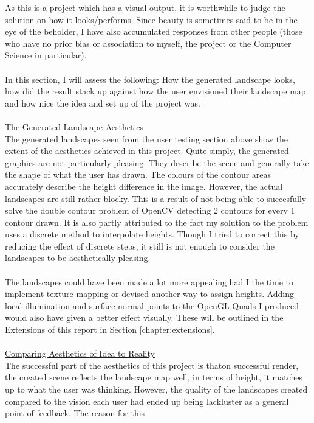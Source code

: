 \documentclass[11pt]{article}
\begin{document}
As this is a project which has a visual output, it is worthwhile to
judge the solution on how it looks/performs. Since beauty is 
sometimes said to be in the eye of the beholder, I have also accumulated
responses from other people (those who have no prior bias or association
to myself, the project or the Computer Science in particular).\\
\\
In this section, I will assess the following: How the generated landscape
looks, how did the result stack up against how the user envisioned their
landscape map and how nice the idea and set up of the project was.\\
\\
\underline{The Generated Landscape Aesthetics}\\
The generated landscapes seen from the user testing section above show
the extent of the aesthetics achieved in this project. Quite simply,
the generated graphics are not particularly pleasing. They describe the
scene and generally take the shape of what the user has drawn. The
colours of the contour areas accurately describe the height difference
in the image. However, the actual landscapes are still rather blocky. This is
a result of not being able to succesfully solve the double contour problem
of OpenCV detecting 2 contours for every 1 contour drawn. It is 
also partly attributed to the fact my solution to the problem uses
a discrete method to interpolate heights. Though I tried to correct this by
reducing the effect of discrete steps, it still is not enough to consider
the landscapes to be aesthetically pleasing. \\
\\
The landscapes could have been made a lot more appealing had I the time
to implement texture mapping or devised another way to assign heights.
Adding local illumination and surface normal points to the OpenGL Quads
I produced would also have given a better effect visually. These will
be outlined in the Extensions of this report in Section \ref{chapter:extensions}.\\
\\
\underline{Comparing Aesthetics of Idea to Reality}\\
The successful part of the aesthetics of this project is thaton successful
render, the created scene reflects the landscape map well, in terms of 
height, it matches up to what the user was thinking. However, the quality 
of the landscapes created compared to the vision each user had ended
up being lackluster as a general point of feedback. The reason for this
\end{document}
